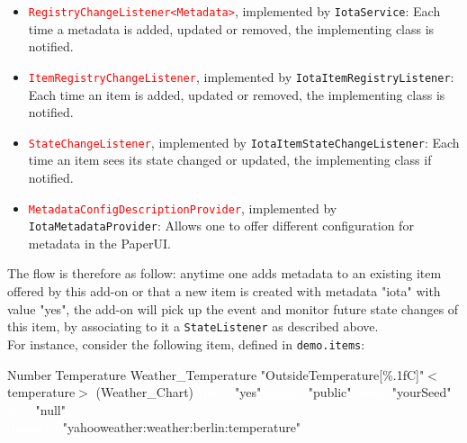 \documentclass[a4paper,10pt]{article}
\begin{document}
\begin{itemize}
	\item \texttt{\textcolor{red}{RegistryChangeListener<Metadata>}}, implemented by \texttt{\textcolor{OliveGreen}{IotaService}}: Each time a metadata is added, updated or removed, the implementing class is notified.
	\item \texttt{\textcolor{red}{ItemRegistryChangeListener}}, implemented by \texttt{\textcolor{OliveGreen}{IotaItemRegistryListener}}: Each time an item is added, updated or removed, the implementing class is notified.
	\item \texttt{\textcolor{red}{StateChangeListener}}, implemented by \texttt{\textcolor{OliveGreen}{IotaItemStateChangeListener}}: Each time an item sees its state changed or updated, the implementing class if notified. 
	\item \texttt{\textcolor{red}{MetadataConfigDescriptionProvider}}, implemented by \texttt{\textcolor{OliveGreen}{IotaMetadataProvider}}: Allows one to offer different configuration for metadata in the PaperUI.
\end{itemize}

\noindent The flow is therefore as follow: anytime one adds metadata to an existing item offered by this add-on or that a new item is created with metadata "iota" with value "yes", the add-on will pick up the event and monitor future state changes of this item, by associating to it a \texttt{StateListener} as described above. \\

\noindent For instance, consider the following item, defined in \texttt{demo.items}:

\begin{center}
\begin{tcolorbox}
\textcolor{TypeItem}{Number}\textcolor{white}{:}\textcolor{TypeItem}{Temperature} \textcolor{NameItem}{Weather\_Temperature} \textcolor{DescriptionItem}{"OutsideTemperature[\%.1f\degree C]"}\textcolor{GroupItem}{$<$temperature$>$} \textcolor{FuncItem}{(Weather\_Chart)} \textcolor{white}{\{iota=}\textcolor{DescriptionItem}{"yes"} \textcolor{white}{[mode=}\textcolor{DescriptionItem}{"public"}\textcolor{white}{,} \textcolor{white}{seed=}\textcolor{DescriptionItem}{"yourSeed"}\textcolor{white}{,} \textcolor{white}{key=}\textcolor{DescriptionItem}{"null"}\textcolor{white}{]}\textcolor{white}{,} \\ \textcolor{white}{channel=} \textcolor{DescriptionItem}{"yahooweather:weather:berlin:temperature"} \textcolor{white}{\}}
\end{tcolorbox}

\end{center}
\end{document}
